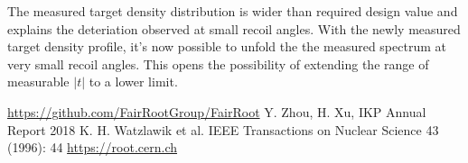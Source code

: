 \documentclass[fleqn,twocolumn,a4paper]{ikpar}
\begin{document}
The measured target density distribution is wider than required design value and
explains the deteriation observed at small recoil angles.
With the newly measured target density profile, it's now possible to unfold the the
measured spectrum at very small recoil angles.
This opens the possibility of extending the range of measurable $|t|$ to a lower limit.

\par
\medskip

\begin{thebibliography}{99}
 \url{https://github.com/FairRootGroup/FairRoot}
 Y. Zhou, H. Xu, IKP Annual Report 2018
 K. H. Watzlawik et al. IEEE Transactions on Nuclear Science 43 (1996): 44
 \url{https://root.cern.ch}
\end{thebibliography}
\end{document}
